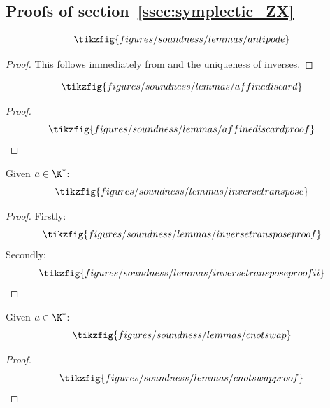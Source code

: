 \subsection{Proofs of section~\ref{ssec:symplectic_ZX}}
\begin{lemma}
  \label{lem:antipode}
  \[\tikzfig{figures/soundness/lemmas/antipode}\]
\end{lemma}
\begin{proof}
  This follows immediately from \TextGAAidoneii and the uniqueness of inverses.
\end{proof}
\begin{lemma}
  \label{lem:affinediscard}
  \[\tikzfig{figures/soundness/lemmas/affinediscard}\]
\end{lemma}
\begin{proof}
  \begin{equation}
    \tikzfig{figures/soundness/lemmas/affinediscardproof}
  \end{equation}
\end{proof}
\begin{lemma}
  \label{lem:inversetranspose}
  Given \(a \in \K^*\):
  \[\tikzfig{figures/soundness/lemmas/inversetranspose}\]
\end{lemma}
\begin{proof}
  Firstly:
  \begin{equation}
    \tikzfig{figures/soundness/lemmas/inversetransposeproof}
  \end{equation}
  Secondly:
  \begin{equation}
    \tikzfig{figures/soundness/lemmas/inversetransposeproofii}
  \end{equation}
\end{proof}
\begin{lemma}
  \label{lem:cnotswap}
  Given \(a \in \K^*\):
  \[\tikzfig{figures/soundness/lemmas/cnotswap}\]
\end{lemma}
\begin{proof}
  \[\tikzfig{figures/soundness/lemmas/cnotswapproof}\]
\end{proof}
